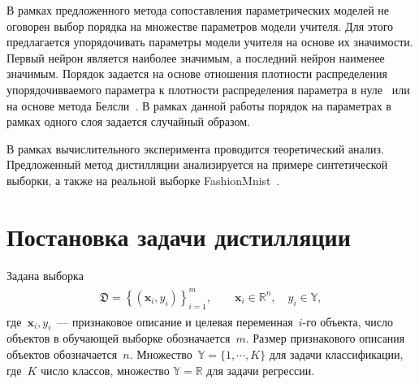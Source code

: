 \documentclass[12pt]{a&t}
\begin{document}
В рамках предложенного метода сопоставления параметрических моделей не оговорен выбор порядка на множестве параметров модели учителя.
Для этого предлагается упорядочивать параметры модели учителя на основе их значимости.
Первый нейрон является наиболее значимым, а последний нейрон наименее значимым.
Порядок задается на основе отношения плотности распределения упорядочивваемого параметра к плотности распределения параметра в нуле~\cite{graves2011} или на основе метода Белсли~\cite{grabovoy2019}.
В рамках данной работы порядок на параметрах в рамках одного слоя задается случайный образом.

В рамках вычислительного эксперимента проводится теоретический анализ. Предложенный метод дистилляции анализируется на примере синтетической выборки, а также на реальной выборке FashionMnist~\cite{fashionmnist}.

\section{Постановка задачи дистилляции}
Задана выборка
\begin{gather}
\label{eq:st:1}
\begin{aligned}
\mathfrak{D} = \left\{\left(\mathbf{x}_i, y_i\right)\right\}_{i=1}^{m}, \qquad \mathbf{x}_i \in \mathbb{R}^{n}, \quad y_i \in \mathbb{Y},
\end{aligned}
\end{gather}
где~$\mathbf{x}_i, y_i$~--- признаковое описание и целевая переменная~$i$-го объекта, число объектов в обучающей выборке обозначается~$m$. Размер признакового описания объектов обозначается~$n$. Множество~$\mathbb{Y}=\{1,\cdots,K\}$ для задачи классификации, где~$K$ число классов, множество $\mathbb{Y}=\mathbb{R}$ для задачи регрессии.
\end{document}
